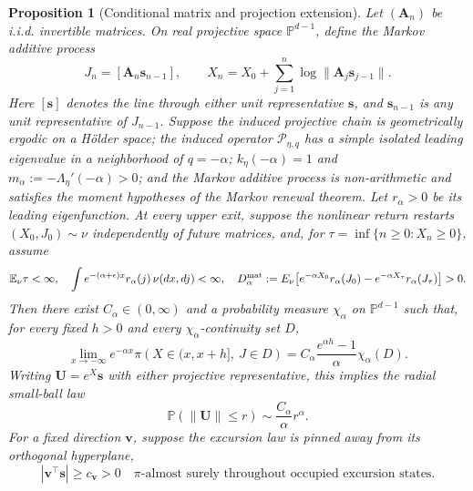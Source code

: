 \documentclass[11pt]{article}
\newtheorem{proposition}[theorem]{Proposition}
\theoremstyle{definition}
\newcommand{\E}{\mathbb E}
\newcommand{\Pp}{\mathbb P}
\newcommand{\svec}{\mathbf s}
\newcommand{\vvec}{\mathbf v}
\newcommand{\Avec}{\mathbf A}
\begin{document}
\begin{proposition}[Conditional matrix and projection extension]
\label{prop:matrix-reinjection}
Let $(\Avec_n)$ be i.i.d. invertible matrices.  On real projective space
$\mathbb P^{d-1}$, define the Markov additive process
\begin{equation}
 J_n=[\Avec_n\svec_{n-1}],
 \qquad
 X_n=X_0+\sum_{j=1}^n\log\|\Avec_j\svec_{j-1}\|.
 \label{eq:projective-additive-process}
\end{equation}
Here $[\svec]$ denotes the line through either unit representative
$\svec$, and $\svec_{n-1}$ is any unit representative of $J_{n-1}$.
Suppose the induced projective chain is geometrically ergodic on a
H\"older space; the induced operator $\mathcal P_{\eta,q}$ has a simple
isolated leading eigenvalue in a neighborhood of $q=-\alpha$;
$k_\eta(-\alpha)=1$ and
$m_\alpha:=-\Lambda_\eta'(-\alpha)>0$; and the Markov additive process is
non-arithmetic and satisfies the moment hypotheses of the Markov renewal
theorem.  Let $r_\alpha>0$ be its leading eigenfunction.  At every upper
exit, suppose the nonlinear return restarts $(X_0,J_0)\sim\nu$ independently
of future matrices, and, for
$\tau=\inf\{n\geq0:X_n\geq0\}$, assume
\begin{equation}
 \E_\nu\tau<\infty,
 \quad
 \int e^{-(\alpha+\epsilon)x}r_\alpha(j)\,\nu(dx,dj)<\infty,
 \quad
 D_\alpha^{\rm mat}:=E_\nu\!\left[
 e^{-\alpha X_0}r_\alpha(J_0)
 -e^{-\alpha X_\tau}r_\alpha(J_\tau)
 \right]>0.
 \label{eq:matrix-regeneration-assumptions}
\end{equation}
Then there exist $C_\alpha\in(0,\infty)$ and a probability measure
$\chi_\alpha$ on $\mathbb P^{d-1}$ such that, for every fixed $h>0$ and
every $\chi_\alpha$-continuity set $D$,
\begin{equation}
 \lim_{x\to-\infty}e^{-\alpha x}
 \pi\!\left(X\in(x,x+h],\ J\in D\right)
 =C_\alpha\frac{e^{\alpha h}-1}{\alpha}\chi_\alpha(D).
 \label{eq:matrix-log-reinjection}
\end{equation}
Writing $\mathbf U=e^X\svec$ with either projective representative, this
implies the radial small-ball law
\begin{equation}
 \Pp(\|\mathbf U\|\leq r)
 \sim\frac{C_\alpha}{\alpha}r^\alpha.
 \label{eq:matrix-radial-small-ball}
\end{equation}
For a fixed direction $\vvec$, suppose the excursion law is pinned away from
its orthogonal hyperplane,
\begin{equation}
 |\vvec^\top\svec|\geq c_\vvec>0
 \quad \pi\text{-almost surely throughout occupied excursion states}.

\end{equation}
\end{proposition}
\end{document}
